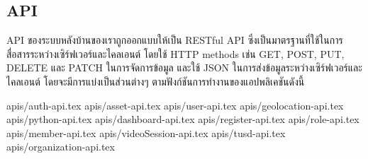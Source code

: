 \subsection{API}

\ifenglish
\else
API ของระบบหลังบ้านของเราถูกออกแบบให้เป็น RESTful API ซึ่งเป็นมาตรฐานที่ใช้ในการสื่อสารระหว่างเซิร์ฟเวอร์และไคลเอนต์ โดยใช้ HTTP methods เช่น GET, POST, PUT, DELETE และ PATCH ในการจัดการข้อมูล และใช้ JSON ในการส่งข้อมูลระหว่างเซิร์ฟเวอร์และไคลเอนต์ โดยจะมีการแบ่งเป็นส่วนต่างๆ ตามฟังก์ชันการทำงานของแอปพลิเคชันดังนี้

{apis/auth-api.tex}
{apis/asset-api.tex}
{apis/user-api.tex}
{apis/geolocation-api.tex}
{apis/python-api.tex}
{apis/dashboard-api.tex}
{apis/register-api.tex}
{apis/role-api.tex}
{apis/member-api.tex}
{apis/videoSession-api.tex}
{apis/tusd-api.tex}
{apis/organization-api.tex}
\fi